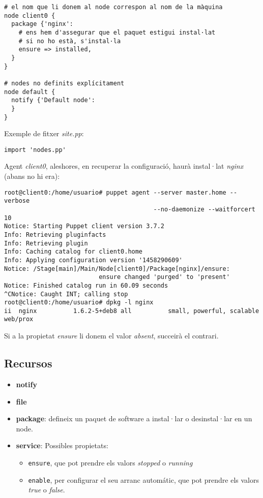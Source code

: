 \documentclass[a4paper]{article}
\begin{document}
\begin{verbatim}
# el nom que li donem al node correspon al nom de la màquina
node client0 {
  package {'nginx':
    # ens hem d'assegurar que el paquet estigui instal·lat
    # si no ho està, s'instal·la
    ensure => installed,
  }  	
}

# nodes no definits explícitament
node default {
  notify {'Default node':
  }
}
\end{verbatim}
Exemple de fitxer \textit{site.pp}:
\begin{verbatim}
import 'nodes.pp'
\end{verbatim}
Agent \textit{client0}, aleshores, en recuperar la configuració, haurà instal·lat \textit{nginx} (abans no hi era):
\begin{verbatim}
root@client0:/home/usuario# puppet agent --server master.home --verbose 
                                         --no-daemonize --waitforcert 10
Notice: Starting Puppet client version 3.7.2
Info: Retrieving pluginfacts
Info: Retrieving plugin
Info: Caching catalog for client0.home
Info: Applying configuration version '1458290609'
Notice: /Stage[main]/Main/Node[client0]/Package[nginx]/ensure: 
                          ensure changed 'purged' to 'present'
Notice: Finished catalog run in 60.09 seconds
^CNotice: Caught INT; calling stop
root@client0:/home/usuario# dpkg -l nginx
ii  nginx          1.6.2-5+deb8 all          small, powerful, scalable web/prox
\end{verbatim}
Si a la propietat \textit{ensure} li donem el valor \textit{absent}, succeirà el contrari.
\subsection{Recursos}
\begin{itemize}
	\item \textbf{notify}
	\item \textbf{file}
	\item \textbf{package}: defineix un paquet de software a instal·lar o desinstal·lar en un node.
	\item \textbf{service}: Possibles propietats:
		\begin{itemize}
			\item \verb+ensure+, que pot prendre els valors \textit{stopped} o \textit{running}
			\item \verb+enable+, per configurar el seu arranc automátic, que pot prendre els valors \textit{true} o \textit{false}.
		\end{itemize}
\end{itemize}
\end{document}
